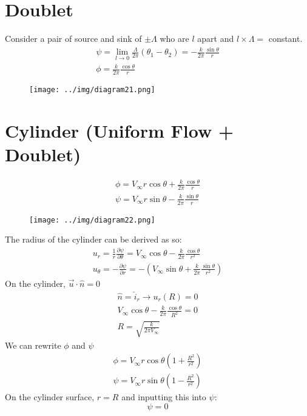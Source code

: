 \documentclass[class=report, crop=false, 12pt,a4paper]{standalone}
\begin{document}
\section{Doublet}
Consider a pair of source and sink of $\pm \Lambda$ who are $l$ apart and $l\times\Lambda = $ constant.
\begin{gather}
  \psi =\lim_{l\rightarrow 0} \frac{\Lambda}{2\pi} (\theta_1 - \theta_2) = -\frac{k}{2\pi} \frac{\sin \theta}{r} \\
  \phi = \frac{k}{2\pi} \frac{\cos \theta}{r}
\end{gather}
\begin{figure}[H]
  \centering
  \texttt{[image: ../img/diagram21.png]}
\end{figure}
\section{Cylinder (Uniform Flow + Doublet)}
\begin{gather}
  \phi = V_{\infty}r\cos\theta + \frac{k}{2\pi} \frac{\cos\theta}{r}\\
  \psi = V_{\infty} r\sin\theta - \frac{k}{2\pi}\frac{\sin\theta}{r}
\end{gather}
\begin{figure}[H]
  \centering
  \texttt{[image: ../img/diagram22.png]}
\end{figure}
The radius of the cylinder can be derived as so:
\begin{gather}
  u_r = \frac{1}{r}\frac{\partial \psi}{\partial \theta} = V_{\infty} \cos\theta - \frac{k}{2\pi}\frac{\cos\theta}{r^2}\\
  u_{\theta} = -\frac{\partial \psi}{\partial r} = - \left( V_{\infty} \sin\theta + \frac{k}{2\pi}\frac{\sin\theta}{r^2} \right)
\end{gather}
On the cylinder, $\vec{u}\cdot\hat{n} = 0$
\begin{gather}
  \hat{n} = \hat{i}_r \rightarrow u_r(R)=0\\
  V_{\infty}\cos\theta - \frac{k}{2\pi}\frac{\cos\theta}{R^2} = 0\\
  R = \sqrt{\frac{k}{2\pi V_{\infty}}}
\end{gather}
We can rewrite $\phi$ and $\psi$
\begin{gather}
  \phi = V_{\infty}r\cos\theta\left(1+\frac{R^2}{r^2}\right)\\
  \psi = V_{\infty}r\sin\theta\left(1-\frac{R^2}{r^2}\right)
\end{gather}
On the cylinder surface, $r =R$ and inputting this into $\psi$:
\begin{equation}
  \psi = 0
\end{equation}
\end{document}
